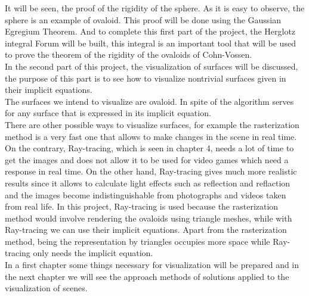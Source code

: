 It will be seen, the proof of the rigidity of the sphere. As it is easy to observe, the sphere is an example of ovaloid. This proof will be done using the Gaussian Egregium Theorem. And to complete this first part of the project, the Herglotz integral Forum will be built, this integral is an important tool that will be used to prove the theorem of the rigidity of the ovaloids of Cohn-Vossen.
${ }$\\

In the second part of this project, the visualization of surfaces will be discussed, the purpose of this part is to see how to visualize nontrivial surfaces given in their implicit equations. 
${ }$\\

The surfaces we intend to visualize are ovaloid. In spite of the algorithm serves for any surface that is expressed in its implicit equation.
${ }$\\

There are other possible ways to visualize surfaces, for example the rasterization method is a very fast one that allows to make changes in the scene in real time. On the contrary, Ray-tracing, which is seen in chapter 4, needs a lot of time to get the images and does not allow it to be used for video games which need a response in real time. On the other hand, Ray-tracing gives much more realistic results since it allows to calculate light effects such as reflection and reflaction and the images become indistinguishable from photographs and videos taken from real life. In this project, Ray-tracing is used because the rasterization method would involve rendering the ovaloids using triangle meshes, while with Ray-tracing we can use their implicit equations. Apart from the rasterization method, being the representation by triangles occupies more space while Ray-tracing only needs the implicit equation.
${ }$\\

In a first chapter some things necessary for visualization will be prepared and in the next chapter we will see the approach methods of solutions applied to the visualization of scenes.
${ }$\\

